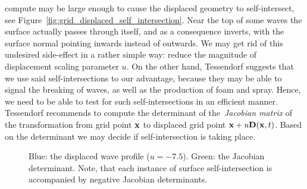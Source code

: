 compute may be large enough to cause the displaced geometry to self-intersect, 
see Figure~\ref{fig:grid_displaced_self_intersection}. Near the top of some 
waves the surface actually passes through itself, and as a consequence inverts, 
with the surface normal pointing inwards instead of outwards. We may get rid of 
this undesired side-effect in a rather simple way: reduce the magnitude of 
displacement scaling parameter $u$.
On the other hand, Tessendorf suggests that we use said self-intersections to 
our advantage, because they may be able to signal the breaking of waves, as 
well as the production of foam and spray. Hence, we need to be able to test
for such self-intersections in an efficient manner. Tessendorf recommends to 
compute the determinant of the~\emph{Jacobian matrix} of the transformation 
from grid point $\mathbf{x}$ to displaced grid point 
$\mathbf{x}+u\mathbf{D}(\mathbf{x},t)$. Based on the determinant we may decide if 
self-intersection is taking place.
%
%
\begin{figure}
\centering
{}
\caption{Blue: the displaced wave profile ($u = -7.5$). Green: the Jacobian 
determinant. Note, that each instance of surface self-intersection is 
accompanied by negative Jacobian determinants.}
\label{fig:grid_displaced_j}
\end{figure}
